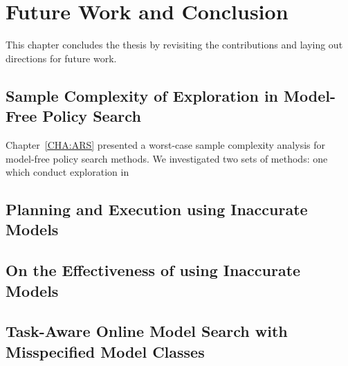 
\chapter{Future Work and Conclusion}
\label{cha:future-work-concl}

This chapter concludes the thesis by revisiting the contributions and
laying out directions for future work.

\section{Sample Complexity of Exploration in Model-Free Policy Search}
\label{sec:sample-compl-expl-1}

Chapter~\ref{CHA:ARS} presented a worst-case sample complexity
analysis for model-free policy search methods. We investigated two
sets of methods: one which conduct exploration in 

\section{Planning and Execution using Inaccurate Models}
\label{sec:plann-exec-using-1}

\section{On the Effectiveness of using Inaccurate Models}
\label{sec:effect-using-inacc-1}

\section{Task-Aware Online Model Search with Misspecified Model
  Classes}
\label{sec:task-aware-online}



